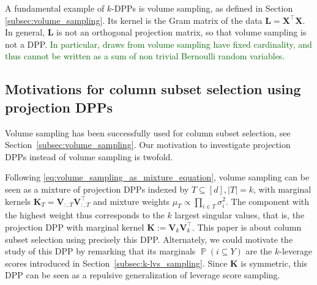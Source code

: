 \documentclass[twoside,11pt]{book}
\newcommand{\rev}[1]{\textcolor{darkgreen}{#1}}
\numberwithin{theorem}{chapter}
\numberwithin{definition}{chapter}
\numberwithin{proposition}{chapter}
\numberwithin{corollary}{chapter}
\numberwithin{example}{chapter}
\numberwithin{lemma}{chapter}
\DeclareMathOperator{\Det}{Det}
\DeclareMathOperator{\Tran}{\intercal}
\DeclareMathOperator{\Prb}{\mathbb{P}}
\begin{document}

A fundamental example of $k$-DPPs is volume sampling, as defined in Section \ref{subsec:volume_sampling}. Its kernel is the Gram matrix of the data $\bm{L} = \bm{X}^{\Tran}\bm{X}$. In general, $\bm{L}$ is not an orthogonal projection matrix, so that volume sampling is not a DPP. \rev{In particular, draws from volume sampling have fixed cardinality, and thus cannot be written as a sum of non trivial Bernoulli random variables.}

\subsection{Motivations for column subset selection using projection DPPs}
Volume sampling has been successfully used for column subset selection, see Section~\ref{subsec:volume_sampling}. Our motivation to investigate projection DPPs instead of volume sampling is twofold.

Following \eqref{eq:volume_sampling_as_mixture_equation}, volume sampling can be seen as a mixture of projection DPPs indexed by $T\subseteq [d], \vert T\vert=k$, with marginal kernels $\bm{K}_{T} = \bm{V}^{}_{:,T}\bm{V}^{\Tran}_{:,T}$ and mixture weights $\mu_{T} \propto \prod_{i \in T} \sigma_{i}^{2}$. The component with the highest weight thus corresponds to the $k$ largest singular values, that is, the projection DPP with marginal kernel
$\bm K:=\bm{V}^{}_{k}\bm{V}_{k}^{\Tran}$. This paper is about column subset selection using precisely this DPP. Alternately, we could motivate the study of this DPP by remarking that its marginals $\Prb({i}\subseteq Y)$ are the $k$-leverage scores introduced in Section~\ref{subsec:k-lvs_sampling}. Since $\bm K$ is symmetric, this DPP can be seen as a repulsive generalization of leverage score sampling.
\end{document}
